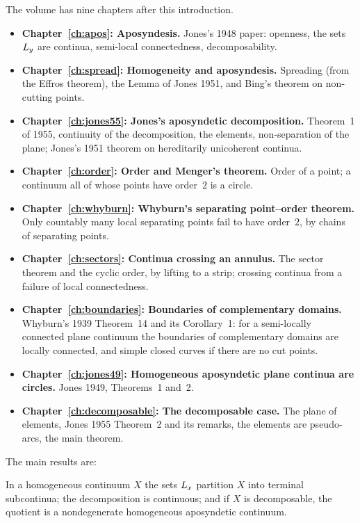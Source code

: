 The volume has nine chapters after this introduction.

\begin{itemize}
\item \textbf{Chapter~\ref{ch:apos}: Aposyndesis.} Jones's 1948 paper: openness, the sets $L_{y}$ are continua, semi-local connectedness, decomposability.
\item \textbf{Chapter~\ref{ch:spread}: Homogeneity and aposyndesis.} Spreading (from the Effros theorem), the Lemma of Jones 1951, and Bing's theorem on non-cutting points.
\item \textbf{Chapter~\ref{ch:jones55}: Jones's aposyndetic decomposition.} Theorem~1 of 1955, continuity of the decomposition, the elements, non-separation of the plane;
Jones's 1951 theorem on hereditarily unicoherent continua.
\item \textbf{Chapter~\ref{ch:order}: Order and Menger's theorem.} Order of a point; a continuum all of whose points have order~$2$ is a circle.
\item \textbf{Chapter~\ref{ch:whyburn}: Whyburn's separating point--order theorem.} Only countably many local separating points fail to have order~$2$, by chains of separating points.
\item \textbf{Chapter~\ref{ch:sectors}: Continua crossing an annulus.} The sector theorem and the cyclic order, by lifting to a strip; crossing continua from a failure of local connectedness.
\item \textbf{Chapter~\ref{ch:boundaries}: Boundaries of complementary domains.} Whyburn's 1939 Theorem~14 and its Corollary~1: for a semi-locally connected plane continuum the
boundaries of complementary domains are locally connected, and simple closed curves if there are no cut points.
\item \textbf{Chapter~\ref{ch:jones49}: Homogeneous aposyndetic plane continua are circles.} Jones 1949, Theorems~1 and~2.
\item \textbf{Chapter~\ref{ch:decomposable}: The decomposable case.} The plane of elements, Jones 1955 Theorem~2 and its remarks, the elements are pseudo-arcs, the main theorem.
\end{itemize}

The main results are:

\begin{theorem}
In a homogeneous continuum $X$ the sets $L_{x}$ partition $X$ into terminal subcontinua; the decomposition is continuous; and if $X$ is decomposable, the quotient is a
nondegenerate homogeneous aposyndetic continuum.
\end{theorem}

